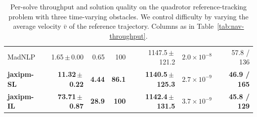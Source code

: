 \begin{table}[t]
{\begin{tabular}{@{}l r r r r r r@{}}
MadNLP & 1.65\,$\pm$\,0.00 & 0.65 & 100 & 1147.5\,$\pm$\,121.2 & $2.0\!\times\!10^{-8}$ & 57.8 / 136 \\
\textbf{jaxipm-SL} & \textbf{11.32\,$\pm$\,0.22} & \textbf{4.44} & \textbf{86.1} & \textbf{1140.5\,$\pm$\,125.3} & {\boldmath$2.7\!\times\!10^{-9}$} & \textbf{46.9 / 165} \\
\textbf{jaxipm-IL} & \textbf{73.71\,$\pm$\,0.87} & \textbf{28.9} & \textbf{100} & \textbf{1142.4\,$\pm$\,131.5} & {\boldmath$3.7\!\times\!10^{-9}$} & \textbf{45.8 / 129} \\
\bottomrule
\end{tabular}}
\caption{Per-solve throughput and solution quality on the quadrotor reference-tracking problem with three time-varying obstacles. We control difficulty by varying the average velocity $\bar{v}$ of the reference trajectory. Columns as in Table~\ref{tab:nav-throughput}.}
\label{tab:track-avoid-throughput}
\end{table}

